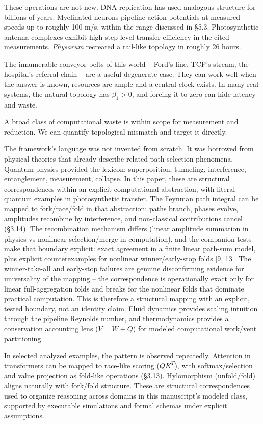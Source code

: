 \documentclass[
  11pt,
]{article}
\begin{document}
These operations are not new. DNA replication has used analogous
structure for billions of years. Myelinated neurons pipeline action
potentials at measured speeds up to roughly 100 m/s, within the range
discussed in §5.3. Photosynthetic antenna complexes exhibit high
step-level transfer efficiency in the cited measurements.
\emph{Physarum} recreated a rail-like topology in roughly 26 hours.

The innumerable conveyor belts of this world -- Ford's line, TCP's
stream, the hospital's referral chain -- are a useful degenerate case.
They can work well when the answer is known, resources are ample and a
central clock exists. In many real systems, the natural topology has
\(\beta_1 > 0\), and forcing it to zero can hide latency and waste.

A broad class of computational waste is within scope for measurement and
reduction. We can quantify topological mismatch and target it directly.

The framework's language was not invented from scratch. It was borrowed
from physical theories that already describe related path-selection
phenomena. Quantum physics provided the lexicon: superposition,
tunneling, interference, entanglement, measurement, collapse. In this
paper, these are structural correspondences within an explicit
computational abstraction, with literal quantum examples in
photosynthetic transfer. The Feynman path integral can be mapped to
fork/race/fold in that abstraction: paths branch, phases evolve,
amplitudes recombine by interference, and non-classical contributions
cancel (§3.14). The recombination mechanism differs (linear amplitude
summation in physics vs nonlinear selection/merge in computation), and
the companion tests make that boundary explicit: exact agreement in a
finite linear path-sum model, plus explicit counterexamples for
nonlinear winner/early-stop folds {[}9, 13{]}. The winner-take-all and
early-stop failures are genuine disconfirming evidence for universality
of the mapping -- the correspondence is operationally exact only for
linear full-aggregation folds and breaks for the nonlinear folds that
dominate practical computation. This is therefore a structural mapping
with an explicit, tested boundary, not an identity claim. Fluid dynamics
provides scaling intuition through the pipeline Reynolds number, and
thermodynamics provides a conservation accounting lens (\(V = W + Q\))
for modeled computational work/vent partitioning.

In selected analyzed examples, the pattern is observed repeatedly.
Attention in transformers can be mapped to race-like scoring (\(QK^T\)),
with softmax/selection and value projection as fold-like operations
(§3.13). Hylomorphism (unfold/fold) aligns naturally with fork/fold
structure. These are structural correspondences used to organize
reasoning across domains in this manuscript's modeled class, supported
by executable simulations and formal schemas under explicit assumptions.
\end{document}
